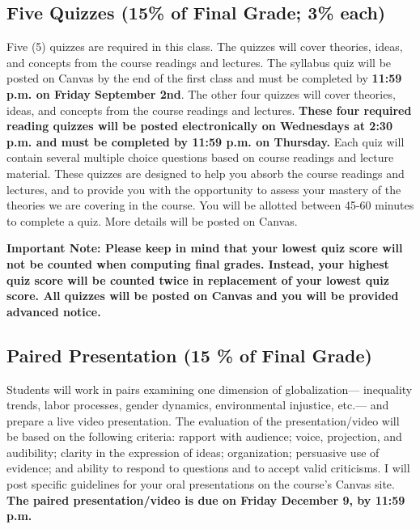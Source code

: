 \documentclass[11pt,]{article}
\begin{document}
\hypertarget{quizzes}{%
\subsection{Five Quizzes (15\% of Final Grade; 3\%
each)}\label{quizzes}}

Five (5) quizzes are required in this class. The quizzes will cover
theories, ideas, and concepts from the course readings and lectures. The
syllabus quiz will be posted on Canvas by the end of the first class and
must be completed by \textbf{11:59 p.m. on Friday September 2nd}. The
other four quizzes will cover theories, ideas, and concepts from the
course readings and lectures. \textbf{These four required reading
quizzes will be posted electronically on Wednesdays at 2:30 p.m. and
must be completed by 11:59 p.m. on Thursday.} Each quiz will contain
several multiple choice questions based on course readings and lecture
material. These quizzes are designed to help you absorb the course
readings and lectures, and to provide you with the opportunity to assess
your mastery of the theories we are covering in the course. You will be
allotted between 45-60 minutes to complete a quiz. More details will be
posted on Canvas.

\textbf{Important Note: Please keep in mind that your lowest quiz score
will not be counted when computing final grades. Instead, your highest
quiz score will be counted twice in replacement of your lowest quiz
score. All quizzes will be posted on Canvas and you will be provided
advanced notice.}

\hypertarget{paired-presentation-15-of-final-grade}{%
\subsection{Paired Presentation (15 \% of Final
Grade)}\label{paired-presentation-15-of-final-grade}}

Students will work in pairs examining one dimension of globalization---
inequality trends, labor processes, gender dynamics, environmental
injustice, etc.--- and prepare a live video presentation. The evaluation
of the presentation/video will be based on the following criteria:
rapport with audience; voice, projection, and audibility; clarity in the
expression of ideas; organization; persuasive use of evidence; and
ability to respond to questions and to accept valid criticisms. I will
post specific guidelines for your oral presentations on the course's
Canvas site. \textbf{The paired presentation/video is due on Friday
December 9, by 11:59 p.m.}
\end{document}
